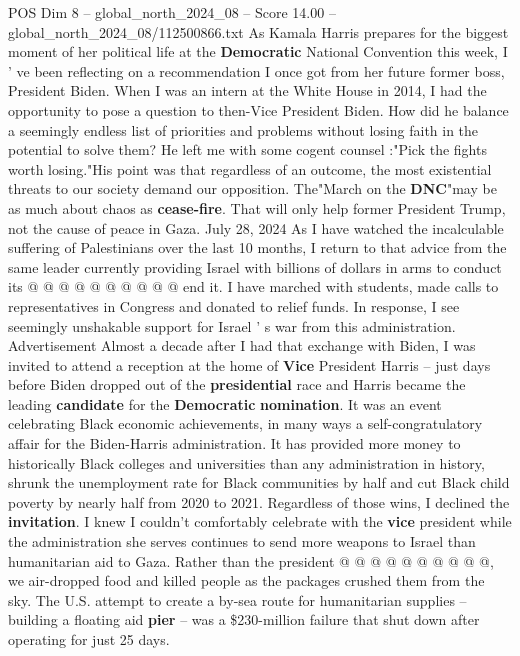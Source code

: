 \begin{textsample}{POS Dim 8 – global\_north\_2024\_08 – Score 14.00 – global\_north\_2024\_08/112500866.txt}  \label{ex:f8_pos_038}
As Kamala Harris prepares for the biggest moment of her political life at the \textbf{Democratic} National Convention this week, I ' ve been reflecting on a recommendation I once got from her future former boss, President Biden.
When I was an intern at the White House in 2014, I had the opportunity to pose a question to then-Vice President Biden.
How did he balance a seemingly endless list of priorities and problems without losing faith in the potential to solve them?
He left me with some cogent counsel :"Pick the fights worth losing."His point was that regardless of an outcome, the most existential threats to our society demand our opposition.
The"March on the \textbf{DNC}"may be as much about chaos as \textbf{cease-fire}.
That will only help former President Trump, not the cause of peace in Gaza.
July 28, 2024 As I have watched the incalculable suffering of Palestinians over the last 10 months, I return to that advice from the same leader currently providing Israel with billions of dollars in arms to conduct its @ @ @ @ @ @ @ @ @ @ end it.
I have marched with students, made calls to representatives in Congress and donated to relief funds.
In response, I see seemingly unshakable support for Israel ' s war from this administration.
Advertisement Almost a decade after I had that exchange with Biden, I was invited to attend a reception at the home of \textbf{Vice} President Harris -- just days before Biden dropped out of the \textbf{presidential} race and Harris became the leading \textbf{candidate} for the \textbf{Democratic} \textbf{nomination}.
It was an event celebrating Black economic achievements, in many ways a self-congratulatory affair for the Biden-Harris administration.
It has provided more money to historically Black colleges and universities than any administration in history, shrunk the unemployment rate for Black communities by half and cut Black child poverty by nearly half from 2020 to 2021.
Regardless of those wins, I declined the \textbf{invitation}.
I knew I couldn't comfortably celebrate with the \textbf{vice} president while the administration she serves continues to send more weapons to Israel than humanitarian aid to Gaza.
Rather than the president @ @ @ @ @ @ @ @ @ @, we air-dropped food and killed people as the packages crushed them from the sky.
The U.S. attempt to create a by-sea route for humanitarian supplies -- building a floating aid \textbf{pier} -- was a \$230-million failure that shut down after operating for just 25 days.

\end{textsample}
